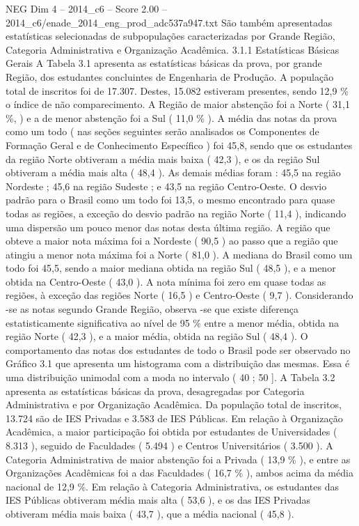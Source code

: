 \begin{textsample}{NEG Dim 4 – 2014\_c6 – Score 2.00 – 2014\_c6/enade\_2014\_eng\_prod\_adc537a947.txt}
São também apresentadas estatísticas selecionadas de subpopulações caracterizadas por Grande Região, Categoria Administrativa e Organização Acadêmica. 3.1.1 Estatísticas Básicas Gerais A Tabela 3.1 apresenta as estatísticas básicas da prova, por grande Região, dos estudantes concluintes de Engenharia de Produção.
A população total de inscritos foi de 17.307.
Destes, 15.082 estiveram presentes, sendo 12,9 \% o índice de não comparecimento.
A Região de maior abstenção foi a Norte ( 31,1 \%, ) e a de menor abstenção foi a Sul ( 11,0 \% ).
A média das notas da prova como um todo ( nas seções seguintes serão analisados os Componentes de Formação Geral e de Conhecimento Específico ) foi 45,8, sendo que os estudantes da região Norte obtiveram a média mais baixa ( 42,3 ), e os da região Sul obtiveram a média mais alta ( 48,4 ).
As demais médias foram : 45,5 na região Nordeste ; 45,6 na região Sudeste ; e 43,5 na região Centro-Oeste.
O desvio padrão para o Brasil como um todo foi 13,5, o mesmo encontrado para quase todas as regiões, a exceção do desvio padrão na região Norte ( 11,4 ), indicando uma dispersão um pouco menor das notas desta última região.
A região que obteve a maior nota máxima foi a Nordeste ( 90,5 ) ao passo que a região que atingiu a menor nota máxima foi a Norte ( 81,0 ).
A mediana do Brasil como um todo foi 45,5, sendo a maior mediana obtida na região Sul ( 48,5 ), e a menor obtida na Centro-Oeste ( 43,0 ).
A nota mínima foi zero em quase todas as regiões, à exceção das regiões Norte ( 16,5 ) e Centro-Oeste ( 9,7 ).
Considerando -se as notas segundo Grande Região, observa -se que existe diferença estatisticamente significativa ao nível de 95 \% entre a menor média, obtida na região Norte ( 42,3 ), e a maior média, obtida na região Sul ( 48,4 ).
O comportamento das notas dos estudantes de todo o Brasil pode ser observado no Gráfico 3.1 que apresenta um histograma com a distribuição das mesmas.
Essa é uma distribuição unimodal com a moda no intervalo ( 40 ; 50 ].
A Tabela 3.2 apresenta as estatísticas básicas da prova, desagregadas por Categoria Administrativa e por Organização Acadêmica.
Da população total de inscritos, 13.724 são de IES Privadas e 3.583 de IES Públicas.
Em relação à Organização Acadêmica, a maior participação foi obtida por estudantes de Universidades ( 8.313 ), seguido de Faculdades ( 5.494 ) e Centros Universitários ( 3.500 ).
A Categoria Administrativa de maior abstenção foi a Privada ( 13,9 \% ), e entre as Organizações Acadêmicas foi a das Faculdades ( 16,7 \% ), ambos acima da média nacional de 12,9 \%.
Em relação à Categoria Administrativa, os estudantes das IES Públicas obtiveram média mais alta ( 53,6 ), e os das IES Privadas obtiveram média mais baixa ( 43,7 ), que a média nacional ( 45,8 ).

\end{textsample}
